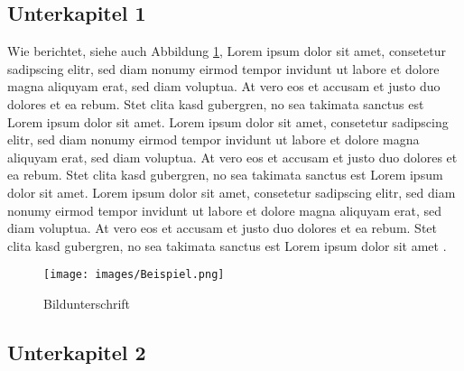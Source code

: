 \subsection{Unterkapitel 1}

Wie \cite{nachname_2005} berichtet, siehe auch Abbildung \ref{fig:Beispiel.png}, Lorem ipsum dolor sit amet, consetetur sadipscing elitr, sed diam nonumy eirmod tempor invidunt ut labore et dolore magna aliquyam erat, sed diam voluptua. At vero eos et accusam et justo duo dolores et ea rebum. Stet clita kasd gubergren, no sea takimata sanctus est Lorem ipsum dolor sit amet. Lorem ipsum dolor sit amet, consetetur sadipscing elitr, sed diam nonumy eirmod tempor invidunt ut labore et dolore magna aliquyam erat, sed diam voluptua. At vero eos et accusam et justo duo dolores et ea rebum. Stet clita kasd gubergren, no sea takimata sanctus est Lorem ipsum dolor sit amet. Lorem ipsum dolor sit amet, consetetur sadipscing elitr, sed diam nonumy eirmod tempor invidunt ut labore et dolore magna aliquyam erat, sed diam voluptua. At vero eos et accusam et justo duo dolores et ea rebum. Stet clita kasd gubergren, no sea takimata sanctus est Lorem ipsum dolor sit amet \citep[vgl.][gemäß freundlicher persönlicher Mitteilung]{nachname_2005}.

\begin{figure}[htb] %
\centering
\texttt{[image: images/Beispiel.png]} %
\caption[Bildunterschrift für das Abb.Verz.]{Bildunterschrift \citep[aus:][]{nachname_2005}}
\label{fig:Beispiel.png} %
\end{figure}

\subsection{Unterkapitel 2}

